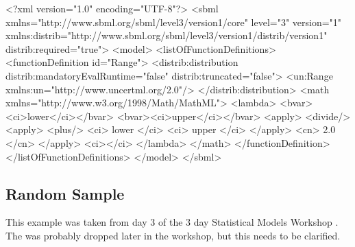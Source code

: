 \documentclass[draftspec]{sbmlpkgspec}
\begin{document}
\begin{example}
<?xml version="1.0" encoding="UTF-8"?>
<sbml xmlns="http://www.sbml.org/sbml/level3/version1/core" level="3" version="1"
      xmlns:distrib="http://www.sbml.org/sbml/level3/version1/distrib/version1" 
      distrib:required="true">
    <model>
        <listOfFunctionDefinitions>
            <functionDefinition id="Range">
                <distrib:distribution distrib:mandatoryEvalRuntime="false"
                       distrib:truncated="false">
                    <un:Range xmlns:un="http://www.uncertml.org/2.0"/>
                </distrib:distribution>
                <math xmlns="http://www.w3.org/1998/Math/MathML">
                    <lambda>
                        <bvar><ci>lower</ci></bvar>
                        <bvar><ci>upper</ci></bvar> 
                        <apply>
                            <divide/>
                            <apply>
                                <plus/>
                                <ci> lower </ci>
                                <ci> upper </ci>
                            </apply>
                            <cn> 2.0 </cn>
                        </apply>
                        <ci></ci>                         
                    </lambda>
                </math>
            </functionDefinition>            </listOfFunctionDefinitions>
    </model>
</sbml>
\end{example}

\subsection{Random Sample}

This example was taken from day 3 of the 3 day Statistical Models
Workshop \cite{hinxton0611}. The 
\contraversial was probably dropped later in the workshop, but this
needs to be clarified.
\end{document}
